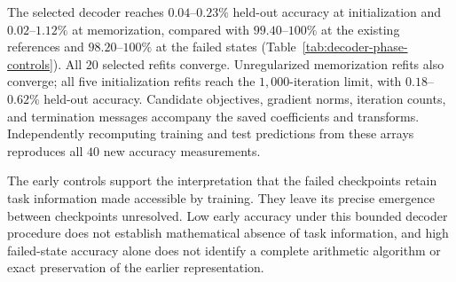 The selected decoder reaches $0.04$--$0.23\%$ held-out accuracy at initialization and $0.02$--$1.12\%$ at memorization, compared with $99.40$--$100\%$ at the existing references and $98.20$--$100\%$ at the failed states (Table~\ref{tab:decoder-phase-controls}). All $20$ selected refits converge. Unregularized memorization refits also converge; all five initialization refits reach the $1{,}000$-iteration limit, with $0.18$--$0.62\%$ held-out accuracy. Candidate objectives, gradient norms, iteration counts, and termination messages accompany the saved coefficients and transforms. Independently recomputing training and test predictions from these arrays reproduces all $40$ new accuracy measurements.

The early controls support the interpretation that the failed checkpoints retain task information made accessible by training. They leave its precise emergence between checkpoints unresolved. Low early accuracy under this bounded decoder procedure does not establish mathematical absence of task information, and high failed-state accuracy alone does not identify a complete arithmetic algorithm or exact preservation of the earlier representation.
